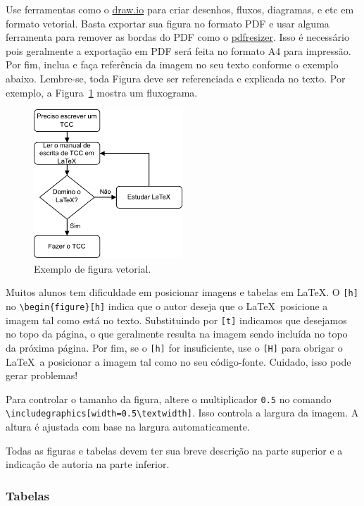 Use ferramentas como o \href{https://draw.io}{draw.io} para criar desenhos, fluxos, diagramas, e etc em formato vetorial. Basta exportar sua figura no formato PDF e usar alguma ferramenta para remover as bordas do PDF como o \href{https://pdfresizer.com/crop}{pdfresizer}. Isso é necessário pois geralmente a exportação em PDF será feita no formato A4 para impressão. Por fim, inclua e faça referência da imagem no seu texto conforme o exemplo abaixo. Lembre-se, toda Figura deve ser referenciada e explicada no texto. Por exemplo, a Figura~\ref{fig1} mostra um fluxograma.

\begin{figure}[h]
	\centering
	\label{fig1}
	\caption{Exemplo de figura vetorial.}
	\includegraphics[width=0.5\textwidth]{figuras/diagrama-tcc-latex.pdf}
\end{figure}

Muitos alunos tem dificuldade em posicionar imagens e tabelas em \LaTeX. O \verb|[h]| no \verb|\begin{figure}[h]| indica que o autor deseja que o \LaTeX\ posicione a imagem tal como está no texto. Substituindo por \verb|[t]| indicamos que desejamos no topo da página, o que geralmente resulta na imagem sendo incluída no topo da próxima página. Por fim, se o \verb|[h]| for insuficiente, use o \verb|[H]| para obrigar o \LaTeX\ a posicionar a imagem tal como no seu código-fonte. Cuidado, isso pode gerar problemas!

Para controlar o tamanho da figura, altere o multiplicador \verb|0.5| no comando \verb|\includegraphics[width=0.5\textwidth]|. Isso controla a largura da imagem. A altura é ajustada com base na largura automaticamente.

Todas as figuras e tabelas devem ter sua breve descrição na parte superior e a indicação de autoria na parte inferior.

\subsubsection{Tabelas}

